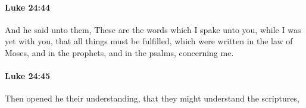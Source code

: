 		\paragraph{Luke 24:44} %
			\label{LUKE-24-44}

			And he said unto them, These are the words which I spake unto you, while I was yet with you, that all things must be fulfilled, which were written in the law of Moses, and in the prophets, and in the psalms, concerning me.

			\begin{framed}
			\scriptsize
				\begin{compactdesc}
					\item[SBLG] 
				\end{compactdesc}
			\end{framed}

		\paragraph{Luke 24:45} %
			\label{LUKE-24-45}

			Then opened he their understanding, that they might understand the scriptures,

